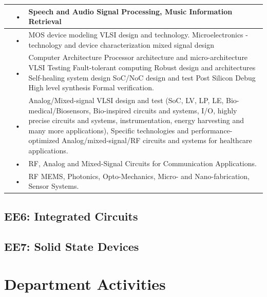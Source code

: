 \documentclass[openany]{book} %
\begin{document}
\begin{tabular}{p{3.5cm} p{3.5cm}p{9cm}}
 \hline 
 \href{https://www.ee.iitb.ac.in/wiki/faculty/prao}{\color{blue}{Prof. Preeti Rao}} & • &  Speech and Audio Signal Processing, Music Information Retrieval \\ 
 \hline 
 \href{https://www.ee.iitb.ac.in/wiki/faculty/dinesh}{\color{blue}{Prof. Dinesh K. Sharma}} & • & MOS device modeling VLSI design and technology. Microelectronics - technology and device characterization mixed signal design \\ 
 \hline 
 \href{https://www.ee.iitb.ac.in/~viren/}{\color{blue}{Prof. Virendra Singh}} & • & Computer Architecture Processor architecture and micro-architecture
VLSI Testing Fault-tolerant computing Robust design and architectures Self-healing system design SoC/NoC design and test Post Silicon Debug High level synthesis Formal verification. \\ 
 \hline 
  \href{https://www.ee.iitb.ac.in/wiki/faculty/mshojaei}{\color{blue}{Prof. Maryam Shojaei Baghini}} & • & Analog/Mixed-signal VLSI design and test (SoC, LV, LP, LE, Bio-
medical/Biosensors, Bio-inspired circuits and systems, I/O, highly precise circuits and systems, instrumentation, energy harvesting and many more applications), Specific technologies and performance-optimized Analog/mixed-signal/RF circuits and systems for healthcare applications.\\ 
\hline 
 \href{https://www.ee.iitb.ac.in/web/people/faculty/home/rajeshzele}{\color{blue}{Prof. Rajesh H. Zele }}& • & RF, Analog and Mixed-Signal Circuits for Communication Applications. \\ 
\hline 
 \href{http://www.ee.iitb.ac.in/~stallur/index.php}{\color{blue}{Prof. Prof. Siddharth Tallur}} & • &  RF MEMS, Photonics, Opto-Mechanics, Micro- and Nano-fabrication, Sensor Systems.\\ 
\hline 
\end{tabular} 
\section{EE6: Integrated Circuits}
\section{EE7: Solid State Devices} 
\chapter{Department Activities}
\end{document}
